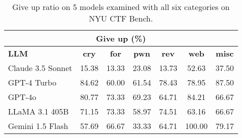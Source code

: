 

\begin{table}[H]
  \centering
  \vspace{10pt}
\caption{Give up ratio on 5 models examined with all six categories on NYU CTF Bench.}
  \begin{tabular}{|l|c|c|c|c|c|c|}
    \hline
    \multicolumn{7}{|c|}{\textbf{Give up (\%)}} \\
    \hline
    \textbf{LLM} & \textbf{cry} & \textbf{for} & \textbf{pwn} & \textbf{rev} & \textbf{web} & \textbf{misc} \\
    \hline
    Claude 3.5 Sonnet &15.38 &13.33 &23.08 &13.73 &52.63 &37.50 \\
    GPT-4 Turbo &84.62 &60.00 &61.54 &78.43 &78.95 &87.50 \\
    GPT-4o &80.77 &73.33 &69.23 &64.71 &84.21 &66.67 \\
    LLaMA 3.1 405B &71.15 &73.33 &58.97 &74.51 &63.16 &66.67 \\
    Gemini 1.5 Flash &57.69 &66.67 &33.33 &64.71 &100.00 &79.17 \\
    \hline
  \end{tabular}
  \label{tab:giveup}
\end{table}